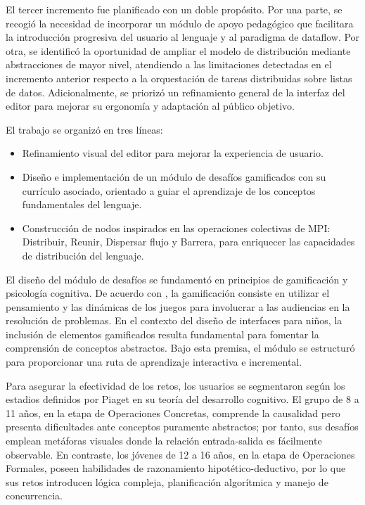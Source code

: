 
El tercer incremento fue planificado con un doble propósito. Por una parte, se recogió la necesidad de incorporar un módulo de apoyo pedagógico que facilitara la introducción progresiva del usuario al lenguaje y al paradigma de dataflow. Por otra, se identificó la oportunidad de ampliar el modelo de distribución mediante abstracciones de mayor nivel, atendiendo a las limitaciones detectadas en el incremento anterior respecto a la orquestación de tareas distribuidas sobre listas de datos. Adicionalmente, se priorizó un refinamiento general de la interfaz del editor para mejorar su ergonomía y adaptación al público objetivo.

El trabajo se organizó en tres líneas:
\begin{itemize}
    \item Refinamiento visual del editor para mejorar la experiencia de usuario.
     \item Diseño e implementación de un módulo de desafíos gamificados con su currículo asociado, orientado a guiar el aprendizaje de los conceptos fundamentales del lenguaje.
     \item Construcción de nodos inspirados en las operaciones colectivas de MPI: Distribuir, Reunir, Dispersar flujo y Barrera, para enriquecer las capacidades de distribución del lenguaje.
\end{itemize}

El diseño del módulo de desafíos se fundamentó en principios de gamificación y psicología cognitiva. De acuerdo con , la gamificación consiste en utilizar el pensamiento y las dinámicas de los juegos para involucrar a las audiencias en la resolución de problemas. En el contexto del diseño de interfaces para niños, la inclusión de elementos gamificados resulta fundamental para fomentar la comprensión de conceptos abstractos. Bajo esta premisa, el módulo se estructuró para proporcionar una ruta de aprendizaje interactiva e incremental.

Para asegurar la efectividad de los retos, los usuarios se segmentaron según los estadios definidos por Piaget en su teoría del desarrollo cognitivo. El grupo de 8 a 11 años, en la etapa de Operaciones Concretas, comprende la causalidad pero presenta dificultades ante conceptos puramente abstractos; por tanto, sus desafíos emplean metáforas visuales donde la relación entrada-salida es fácilmente observable. En contraste, los jóvenes de 12 a 16 años, en la etapa de Operaciones Formales, poseen habilidades de razonamiento hipotético-deductivo, por lo que sus retos introducen lógica compleja, planificación algorítmica y manejo de concurrencia.

